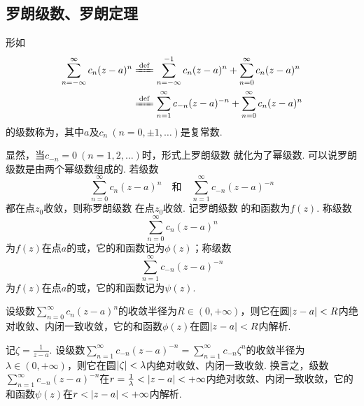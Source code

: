 \subsection{罗朗级数、罗朗定理}
\begin{definition}
形如\begin{equation}\label{equation:解析函数的级数表示.罗朗级数}
\begin{split}
\sum_{n=-\infty}^\infty c_n (z-a)^n
&\defeq \sum_{n=-\infty}^{-1} c_n (z-a)^n + \sum_{n=0}^\infty c_n (z-a)^n \\
&\defeq \sum_{n=1}^\infty c_{-n} (z-a)^{-n} + \sum_{n=0}^\infty c_n (z-a)^n
\end{split}
\end{equation}的级数称为，其中\(a\)及\(c_n\ (n=0,\pm1,\dotsc)\)是复常数.
\end{definition}
显然，当\(c_{-n}=0\ (n=1,2,\dotsc)\)时，形式上罗朗级数  就化为了幂级数.
可以说罗朗级数是由两个幂级数组成的.
若级数\[
\sum_{n=0}^\infty c_n (z-a)^n
\quad\text{和}\quad
\sum_{n=1}^\infty c_{-n} (z-a)^{-n}
\]都在点\(z_0\)收敛，则称罗朗级数  在点\(z_0\)收敛.
记罗朗级数  的和函数为\(f(z)\).
称级数\[
\sum_{n=0}^\infty c_n (z-a)^n
\]为\(f(z)\)在点\(a\)的或，它的和函数记为\(\phi(z)\)；称级数\[
\sum_{n=1}^\infty c_{-n} (z-a)^{-n}
\]为\(f(z)\)在点\(a\)的或，它的和函数记为\(\psi(z)\).

设级数\(\sum_{n=0}^\infty c_n (z-a)^n\)的收敛半径为\(R \in (0,+\infty)\)，则它在圆\(\abs{z-a}<R\)内绝对收敛、内闭一致收敛，它的和函数\(\phi(z)\)在圆\(\abs{z-a}<R\)内解析.

记\(\zeta = \frac{1}{z-a}\).
设级数\(\sum_{n=1}^\infty c_{-n} (z-a)^{-n} = \sum_{n=1}^\infty c_{-n} \zeta^n\)的收敛半径为\(\lambda \in (0,+\infty)\)，则它在圆\(\abs{\zeta} < \lambda\)内绝对收敛、内闭一致收敛.
换言之，级数\(\sum_{n=1}^\infty c_{-n} (z-a)^{-n}\)在\(r = \frac{1}{\lambda} < \abs{z-a} < +\infty\)内绝对收敛、内闭一致收敛，它的和函数\(\psi(z)\)在\(r < \abs{z-a} < +\infty\)内解析.

